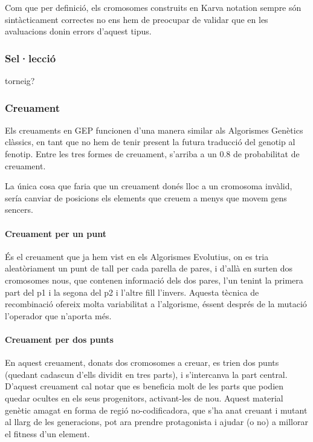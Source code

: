 \documentclass[titlepage,a4paper,12pt]{book}
\begin{document}
Com que per definició, els cromosomes construits en Karva notation sempre són
sintàcticament correctes no ens hem de preocupar de validar que en les
avaluacions donin errors d'aquest tipus.

\subsubsection{Sel·lecció} %
\label{ssub:Seleccio}
torneig?

\subsubsection{Creuament} %
\label{Gssub:Creuament}

Els creuaments en GEP funcionen d'una manera similar als Algorismes Genètics
clàssics, en tant que no hem de tenir present la futura traducció del genotip al
fenotip.  Entre les tres formes de creuament, s'arriba a un 0.8 de probabilitat
de creuament.

La única cosa que faria que un creuament donés lloc a un cromosoma invàlid,
sería canviar de posicions els elements que creuem a menys que movem gens
sencers.

\paragraph{Creuament per un punt} %
\label{par:Creuament per un punt}
És el creuament que ja hem vist en els Algorismes Evolutius, on es tria
aleatòriament un punt de tall per cada parella de pares, i d'allà en surten dos
cromosomes nous, que contenen informació dels dos pares, l'un tenint la primera
part del p1 i la segona del p2 i l'altre fill l'invers.  Aquesta tècnica de
recombinació ofereix molta variabilitat a l'algorisme, éssent després de la
mutació l'operador que n'aporta més.
\paragraph{Creuament per dos punts} %
\label{par:Creuament per dos punts}
En aquest creuament, donats dos cromosomes a creuar, es trien dos punts (quedant
cadascun d'ells dividit en tres parts), i s'intercanva la part central.
D'aquest creuament cal notar que es beneficia molt de les parts que podien
quedar ocultes en els seus progenitors, activant-les de nou.  Aquest material
genètic amagat en forma de regió no-codificadora, que s'ha anat creuant i mutant
al llarg de les generacions, pot ara prendre protagonista i ajudar (o no) a
millorar el fitness d'un element.
\end{document}
